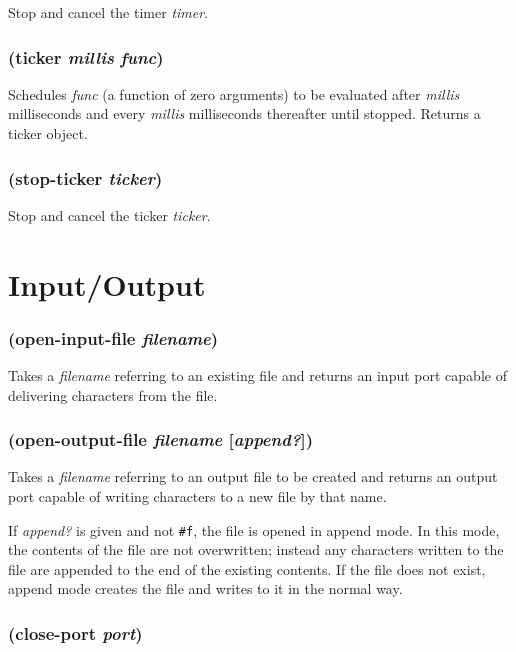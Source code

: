 \documentclass{article}
\begin{document}
Stop and cancel the timer \emph{timer}.

\subsubsection{(ticker \emph{millis} \emph{func})}

Schedules \emph{func} (a function of zero arguments) to be evaluated after \emph{millis}
milliseconds and every \emph{millis} milliseconds thereafter until stopped. Returns a ticker
object.

\subsubsection{(stop-ticker \emph{ticker})}

Stop and cancel the ticker \emph{ticker}.

\section{Input/Output}\label{sec:inputoutput}

\subsubsection{(open-input-file \emph{filename})}

Takes a \emph{filename} referring to an existing file and returns an input port capable of
delivering characters from the file.

\subsubsection{(open-output-file \emph{filename} [\emph{append?}])}

Takes a \emph{filename} referring to an output file to be created and returns an output port
capable of writing characters to a new file by that name.

If \emph{append?} is given and not \verb|#f|, the file is opened in append mode. In this
mode, the contents of the file are not overwritten; instead any characters written to the file
are appended to the end of the existing contents. If the file does not exist, append mode
creates the file and writes to it in the normal way.

\subsubsection{(close-port \emph{port})}
\end{document}
